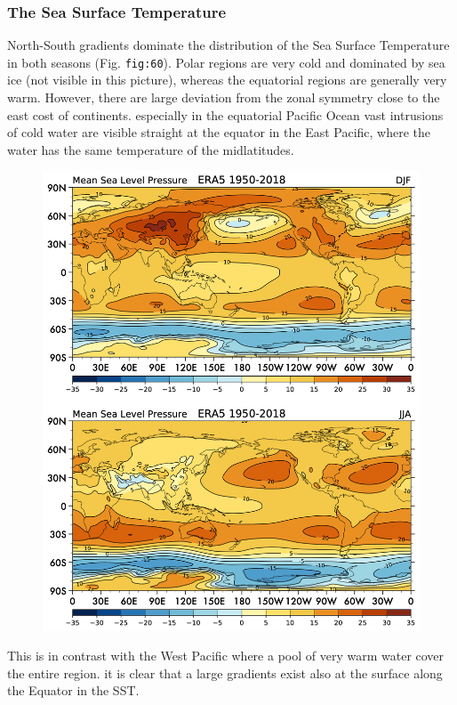
\subsubsection{The Sea Surface
Temperature}\label{the-sea-surface-temperature}

North-South gradients dominate the distribution of the Sea Surface
Temperature in both seasons (Fig. \texttt{fig:60}). Polar regions are
very cold and dominated by sea ice (not visible in this picture),
whereas the equatorial regions are generally very warm. However, there
are large deviation from the zonal symmetry close to the east cost of
continents. especially in the equatorial Pacific Ocean vast intrusions
of cold water are visible straight at the equator in the East Pacific,
where the water has the same temperature of the midlatitudes.

\begin{figure}
\centering
\includegraphics[width = .7 \textwidth]{figs/GD/MSL.png}
\caption{}\label{}
\end{figure}

This is in contrast with the West Pacific where a pool of very warm
water cover the entire region. it is clear that a large gradients exist
also at the surface along the Equator in the SST.


